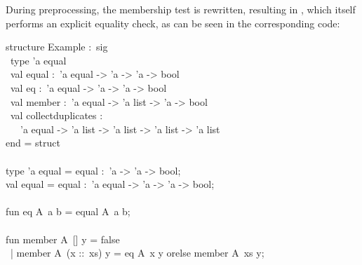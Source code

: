 \begin{isabellebody}
{\isafoldquote}%
%
\isadelimquote
%
\endisadelimquote
%
\begin{isamarkuptext}%
\noindent During preprocessing, the membership test is rewritten,
  resulting in , which itself performs an explicit
  equality check, as can be seen in the corresponding  code:%
\end{isamarkuptext}%
\isamarkuptrue%
%
\isadelimquote
%
\endisadelimquote
%
\isatagquote
%
\begin{isamarkuptext}%
\isatypewriter%
\noindent%
\hspace*{0pt}structure Example :~sig\\
\hspace*{0pt} ~type 'a equal\\
\hspace*{0pt} ~val equal :~'a equal -> 'a -> 'a -> bool\\
\hspace*{0pt} ~val eq :~'a equal -> 'a -> 'a -> bool\\
\hspace*{0pt} ~val member :~'a equal -> 'a list -> 'a -> bool\\
\hspace*{0pt} ~val collect{}duplicates :\\
\hspace*{0pt} ~~~'a equal -> 'a list -> 'a list -> 'a list -> 'a list\\
\hspace*{0pt}end = struct\\
\hspace*{0pt}\\
\hspace*{0pt}type 'a equal = {}equal :~'a -> 'a -> bool{};\\
\hspace*{0pt}val equal = {}equal :~'a equal -> 'a -> 'a -> bool;\\
\hspace*{0pt}\\
\hspace*{0pt}fun eq A{}~a b = equal A{}~a b;\\
\hspace*{0pt}\\
\hspace*{0pt}fun member A{}~[] y = false\\
\hspace*{0pt} ~| member A{}~(x ::~xs) y = eq A{}~x y orelse member A{}~xs y;\\

\end{isamarkuptext}
\end{isabellebody}
